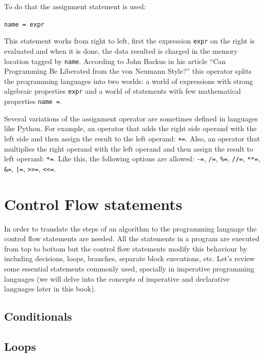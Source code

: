 To do that the assignment statement is used: 

\texttt{name = expr}
 
This statement works from right to left, first the expression \texttt{expr} on the right is evaluated and
when it is done, the data resulted is charged in the memory location tagged by \texttt{name}.
According to John Backus in his article ``Can Programming Be Liberated from the von Neumann Style?'' 
this operator splits the programming languages into two worlds: 
a world of expressions with strong algebraic properties \texttt{expr} and 
a world of statements with few mathematical properties \texttt{name =}.

Several variations of the assignment operator are sometimes defined in languages like Python. 
For example, 
an operator that adds the right side operand with the left side and then assign the result to the left operand: \texttt{+=}.
Also, an operator that multiplies the right operand with the left operand and then assign the result to left operand: \texttt{*=}.
Like this, the following options are allowed: \texttt{-=}, \texttt{/=}, \texttt{\%=}, \texttt{//=}, \texttt{**=}, \texttt{\&=}, \texttt{|=}, \texttt{>>=}, \texttt{<<=}.  %



    \section{Control Flow statements}
In order to translate the steps of an algorithm to the programming language the control flow statements are needed. 
All the statements in a program are executed from top to bottom but 
the control flow statements modify this behaviour by including decisions, 
loops, branches, separate block executions, etc. 
Let's review some essential statements commonly used, 
specially in imperative programming languages 
(we will delve into the concepts of imperative and declarative languages later in this book).


        \subsection*{Conditionals}
        
        
        
        \subsection*{Loops}
        
